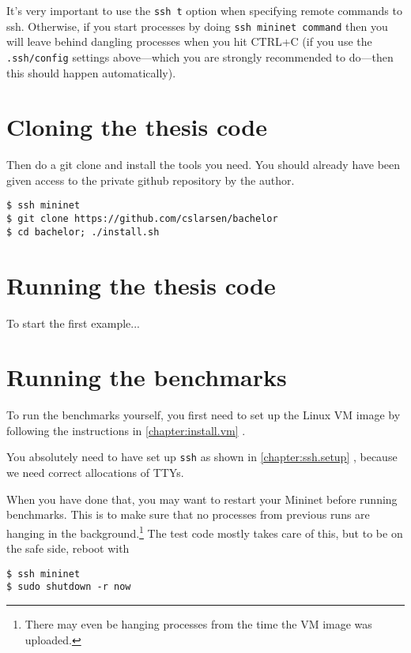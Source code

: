 It's very important to use the \texttt{ssh \-{}t} option when specifying
remote commands to ssh. Otherwise, if you start processes by doing
\texttt{ssh mininet command} then you will leave behind dangling processes
when you hit CTRL+C (if you use the \texttt{.ssh/config} settings
above---which you are strongly recommended to do---then this should
happen automatically).

\section{Cloning the thesis code}

Then do a git clone and install the tools you need. You should already have
been given access to the private github repository by the author.

\begin{Verbatim}
$ ssh mininet
$ git clone https://github.com/cslarsen/bachelor
$ cd bachelor; ./install.sh
\end{Verbatim}

\section{Running the thesis code}

To start the first example...

\section{Running the benchmarks}
\label{chapter:appendix.benchmark}

To run the benchmarks yourself, you first need to set up the Linux VM image
by following the instructions in \ref{chapter:install.vm}
.

You absolutely need to have set up \texttt{ssh} as shown in
\ref{chapter:ssh.setup} , because we need
correct allocations of TTYs.

When you have done that, you may want to restart your Mininet before running
benchmarks.  This is to make sure that no processes from previous runs are
hanging in the background.\footnote{There may even be hanging processes from
the time the VM image was uploaded.} The test code mostly takes care of
this, but to be on the safe side, reboot with

\begin{Verbatim}
$ ssh mininet
$ sudo shutdown -r now
\end{Verbatim}

